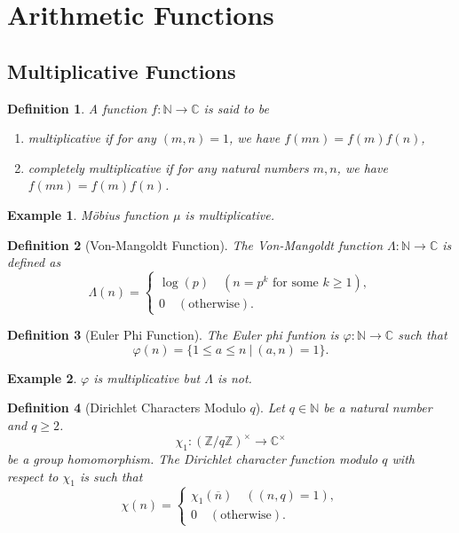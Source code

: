 \documentclass{article}
\newtheorem{definition}{Definition}[section]
\newtheorem{example}{Example}[section]
\newcommand{\N}[0]{\mathbb{N}}
\newcommand{\Z}[0]{\mathbb{Z}}
\newcommand{\C}[0]{\mathbb{C}}
\newcommand{\sep}[0]{\:|\:}
\begin{document}
\section{Arithmetic Functions}
\subsection{Multiplicative Functions}
\begin{definition}
  A function $f:\N\to\C$ is said to be 
  \begin{enumerate}[1).]
    \item multiplicative if for any $(m,n)=1$, we have $f(mn) = f(m)f(n)$,
    \item completely multiplicative if for any natural numbers $m,n$, we have $f(mn) = f(m)f(n)$.
  \end{enumerate}
\end{definition}

\begin{example}
  Möbius function $\mu$ is multiplicative. 
\end{example}

\begin{definition}[Von-Mangoldt Function]
  The Von-Mangoldt function $\Lambda:\N\to\C$ is defined as 
  \begin{equation*}
    \Lambda(n) = \begin{cases}
      \log(p)\quad (n=p^k\text{ for some $k\geq 1$}),\\
      0\quad(\text{otherwise}).
    \end{cases}
  \end{equation*}
\end{definition}

\begin{definition}[Euler Phi Function]
  The Euler phi funtion is $\varphi:\N\to\C$ such that 
  \begin{equation*}
    \varphi(n) = \{1\leq a\leq n\sep (a,n) = 1\}.
  \end{equation*}
\end{definition}

\begin{example}
  $\varphi$ is multiplicative but $\Lambda$ is not. 
\end{example}

\begin{definition}[Dirichlet Characters Modulo $q$]
  Let $q\in\N$ be a natural number and $q\geq2$.
  \begin{equation*}
    \chi_1:(\Z/q\Z)^\times \to\C^\times
  \end{equation*}
  be a group homomorphism. The Dirichlet character function modulo $q$ with respect to $\chi_1$ is such that 
  \begin{equation*}
    \chi(n) = \begin{cases}
      \chi_1(\overline{n})\quad ((n,q) = 1),\\
      0\quad(\text{otherwise}).
    \end{cases}
  \end{equation*}
\end{definition}
\end{document}
